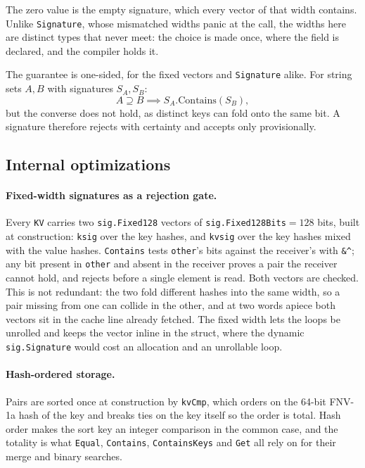 \documentclass[11pt]{article}
\newcommand{\code}[1]{\texttt{#1}}
\begin{document}
The zero value is the empty signature, which every vector of that width
contains. Unlike \code{Signature}, whose mismatched widths panic at the call,
the widths here are distinct types that never meet: the choice is made once,
where the field is declared, and the compiler holds it.

The guarantee is one-sided, for the fixed vectors and \code{Signature} alike.
For string sets $A, B$ with signatures $S_A, S_B$:
\[
  A \supseteq B \implies S_A.\mathrm{Contains}(S_B),
\]
but the converse does not hold, as distinct keys can fold onto the same bit. A
signature therefore rejects with certainty and accepts only provisionally.

\subsection{Internal optimizations}

\paragraph{Fixed-width signatures as a rejection gate.} Every \code{KV} carries
two \code{sig.Fixed128} vectors of \code{sig.Fixed128Bits}${}=128$ bits, built
at construction: \code{ksig}
over the key hashes, and \code{kvsig} over the key hashes mixed with the value
hashes. \code{Contains} tests \code{other}'s bits against the receiver's with
\code{\&\^{}}; any bit present in \code{other} and absent in the receiver proves
a pair the receiver cannot hold, and rejects before a single element is read.
Both vectors are checked. This is not redundant: the two fold different hashes
into the same width, so a pair missing from one can collide in the other, and at
two words apiece both vectors sit in the cache line already fetched. The
fixed width lets the loops be unrolled and keeps the vector inline in the
struct, where the dynamic \code{sig.Signature} would cost an allocation and an
unrollable loop.

\paragraph{Hash-ordered storage.} Pairs are sorted once at construction by
\code{kvCmp}, which orders on the 64-bit FNV-1a hash of the key and breaks ties
on the key itself so the order is total. Hash order makes the sort key an
integer comparison in the common case, and the totality is what \code{Equal},
\code{Contains}, \code{ContainsKeys} and \code{Get} all rely on for their merge
and binary searches.
\end{document}
